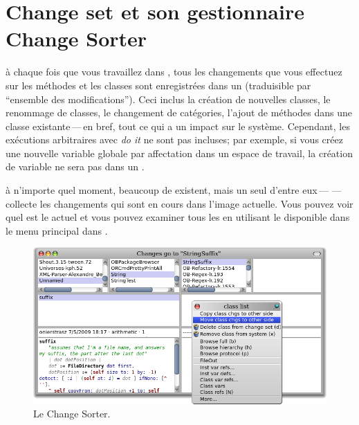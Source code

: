 \documentclass[a4paper,10pt,twoside]{book}
\begin{document}
\section{Change set et son gestionnaire Change Sorter}

à chaque fois que vous travaillez dans \pharo, tous les changements que vous effectuez
sur les méthodes et les classes sont enregistrées dans un
 (traduisible par ``ensemble des modifications'').
Ceci inclus la création de nouvelles classes, le renommage de classes, le changement de
catégories, l'ajout de méthodes dans une classe existante\,---\,en bref, tout ce qui a un impact sur le système.
Cependant, les exécutions arbitraires avec \emph{do it} ne sont pas
incluses; par exemple, si vous créez une nouvelle variable globale par affectation dans 
un espace de travail, la création de variable ne sera pas dans un 
.

à n'importe quel moment, beaucoup de \changesets existent, mais un seul d'entre eux\,---\,\,---\,collecte les changements qui sont en cours dans l'image actuelle.
Vous pouvez voir quel \changeset est le \changeset actuel et vous pouvez examiner
tous les \changesets en utilisant le  disponible dans le menu
principal dans .

\begin{figure}[btp]
	\begin{center}
		\includegraphics[width=\linewidth]{changeSorter}
	\end{center}
	\caption{Le Change Sorter.}
\end{figure}
\end{document}
